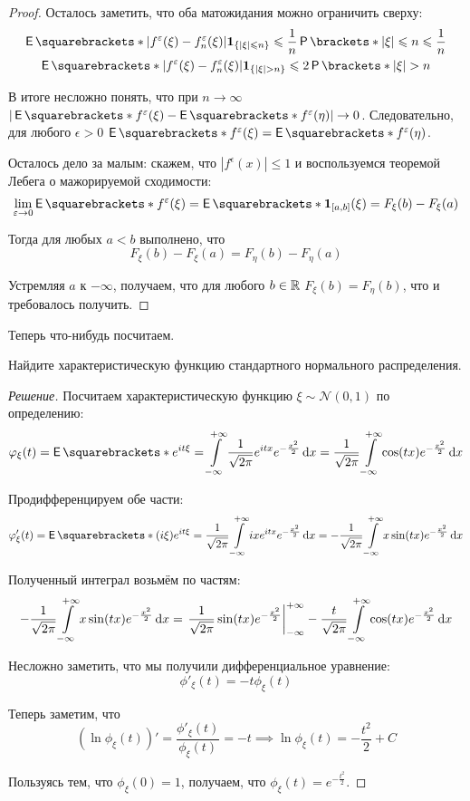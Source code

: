 \begin{proof}
	Осталось заметить, что оба матожидания можно ограничить сверху:
	\begin{gather*}
		\E{|f^{\epsilon}(\xi) - f_{n}^{\epsilon}(\xi)| \mathbf{1}_{\{|\xi| \leq 
		n\}}} \leq \frac{1}{n}\Pr{|\xi| \leq n} \leq \frac{1}{n}\\
		\E{|f^{\epsilon}(\xi) - f_{n}^{\epsilon}(\xi)| \mathbf{1}_{\{|\xi| > 
		n\}}} \leq 2\Pr{|\xi| > n}
	\end{gather*}

	В итоге несложно понять, что при \(n \to \infty\) \(|\E{f^{\epsilon}(\xi)} 
	- \E{f^{\epsilon}(\eta)}| \to 0\). Следовательно, для любого \(\epsilon > 
	0\) \(\E{f^{\epsilon}(\xi)} = \E{f^{\epsilon}(\eta)}\). 
	
	Осталось дело за малым: скажем, что \(|f^{\epsilon}(x)| \leq 1\) и 
	воспользуемся теоремой Лебега о мажорируемой сходимости:
	\[
		\lim\limits_{\epsilon \to 0} \E{f^{\epsilon}(\xi)} = \E{\mathbf{1}_{[a, 
		b]}(\xi)} = F_{\xi}(b) - F_{\xi}(a)
	\]
	
	Тогда для любых \(a < b\) выполнено, что
	\[
		F_{\xi}(b) - F_{\xi}(a) = F_{\eta}(b) - F_{\eta}(a)
	\]
	
	Устремляя \(a\) к \(-\infty\), получаем, что для любого \(b \in \mathbb{R}\) 
	\(F_{\xi}(b) = F_{\eta}(b)\), что и требовалось получить.
\end{proof}

Теперь что-нибудь посчитаем.
\begin{problem}
	Найдите характеристическую функцию стандартного нормального распределения.
\end{problem}
\begin{proof}[Решение]
	Посчитаем характеристическую функцию \(\xi \sim \mathcal{N}(0, 1)\) по 
	определению:
	\[
		\phi_{\xi}(t) = \E{e^{it\xi}} = \int\limits_{-\infty}^{+\infty} 
		\frac{1}{\sqrt{2\pi}}e^{itx}e^{-\frac{x^2}{2}}\diff x = 
		\frac{1}{\sqrt{2\pi}}\int\limits_{-\infty}^{+\infty} 
		\cos(tx)e^{-\frac{x^2}{2}}\diff x
	\]
	
	Продифференцируем обе части:
	\[
		\phi'_{\xi}(t) = \E{(i\xi)e^{it\xi}} = 
		\frac{1}{\sqrt{2\pi}}\int\limits_{-\infty}^{+\infty} 
		ixe^{itx}e^{-\frac{x^2}{2}}\diff x = 
		-\frac{1}{\sqrt{2\pi}}\int\limits_{-\infty}^{+\infty} 
		x\sin(tx)e^{-\frac{x^2}{2}}\diff x
	\]
	
	Полученный интеграл возьмём по частям:
	\[
		-\frac{1}{\sqrt{2\pi}}\int\limits_{-\infty}^{+\infty} 
		x\sin(tx)e^{-\frac{x^2}{2}}\mathop{}\!\mathrm{d} x = 
		\left. \frac{1}{\sqrt{2\pi}} \sin(tx) e^{-\frac{x^2}{2}} 
		\right|_{-\infty}^{+\infty} - 
		\frac{t}{\sqrt{2\pi}}\int\limits_{-\infty}^{+\infty} 
		\cos(tx)e^{-\frac{x^2}{2}}\mathop{}\!\mathrm{d} x
	\]
	
	Несложно заметить, что мы получили дифференциальное уравнение:
	\[
		\phi'_{\xi}(t) = -t\phi_{\xi}(t)
	\]
	
	Теперь заметим, что
	\[
		\left(\ln \phi_{\xi}(t)\right)' = \frac{\phi'_{\xi}(t)}{\phi_{\xi}(t)} 
		= -t \implies \ln \phi_{\xi}(t) = -\frac{t^2}{2} + C
	\]
	
	Пользуясь тем, что \(\phi_{\xi}(0) = 1\), получаем, что \(\phi_{\xi}(t) = 
	e^{-\frac{t^2}{2}}\).
\end{proof}

